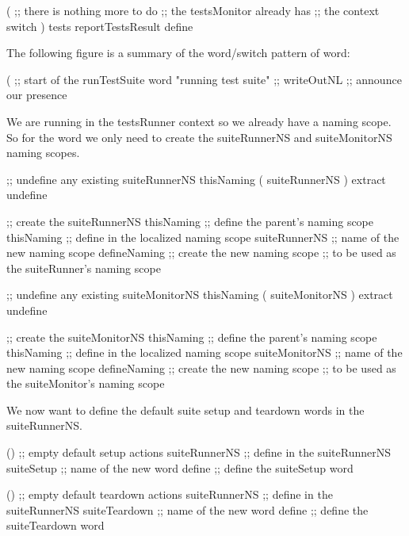 \startJoylolCode
(
          ;; there is nothing more to do
          ;; the testsMonitor already has
          ;; the context switch 
)
tests
reportTestsResult
define
\stopJoylolCode

\stopTestSuite


The following figure is a summary of the word/switch pattern of 
 word: 


\startJoylolCode
(                       ;; start of the runTestSuite word
  "running test suite"  ;;
  writeOutNL            ;; announce our presence
\stopJoylolCode

We are running in the testsRunner context so we already have a 
 naming scope. So for the  word we 
only need to create the suiteRunnerNS and suiteMonitorNS naming scopes. 

\startJoylolCode
  ;; undefine any existing suiteRunnerNS
  thisNaming
  ( suiteRunnerNS ) extract
  undefine

  ;; create the suiteRunnerNS
  thisNaming    ;; define the parent's naming scope
  thisNaming    ;; define in the localized naming scope
  suiteRunnerNS ;; name of the new naming scope
  defineNaming  ;; create the new naming scope
                ;; to be used as the suiteRunner's naming scope
\stopJoylolCode

\startJoylolCode
  ;; undefine any existing suiteMonitorNS
  thisNaming
  ( suiteMonitorNS ) extract
  undefine

  ;; create the suiteMonitorNS
  thisNaming      ;; define the parent's naming scope
  thisNaming      ;; define in the localized naming scope
  suiteMonitorNS  ;; name of the new naming scope
  defineNaming    ;; create the new naming scope
                  ;; to be used as the suiteMonitor's naming scope
\stopJoylolCode

We now want to define the default suite setup and teardown words in the 
suiteRunnerNS. 

\startJoylolCode
  ()            ;; empty default setup actions
  suiteRunnerNS ;; define in the suiteRunnerNS
  suiteSetup    ;; name of the new word
  define        ;; define the suiteSetup word
\stopJoylolCode

\startJoylolCode
  ()            ;; empty default teardown actions
  suiteRunnerNS ;; define in the suiteRunnerNS
  suiteTeardown ;; name of the new word
  define        ;; define the suiteTeardown word
\stopJoylolCode

